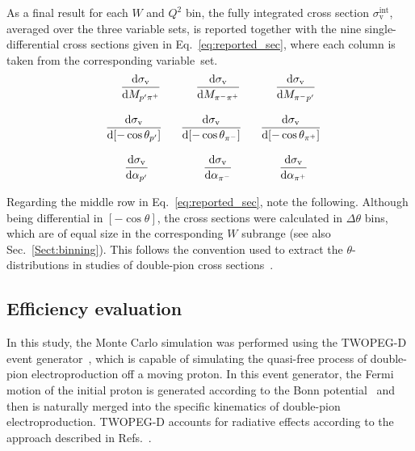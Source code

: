 \documentclass[prc,twocolumn,superscriptaddress,showpacs,amssymb,amsmath,amsfonts,aps,nofootinbib]{revtex4-1}
\begin{document}
As a final result for each $W$ and $Q^{2}$ bin, the fully integrated cross section $\sigma_{\text{v}}^{\text{int}}$, averaged over the three variable sets, is reported together with the nine single-differential cross sections given in Eq.\!~\eqref{eq:reported_sec}, where each column is taken from the corresponding variable~set.
\begin{equation}
\begin{aligned}
&~~~~~~\frac{\textrm{\textrm{d}}\sigma_{\text{v}}}{\textrm{d}M_{p'\pi^{+}}}&&~~~~~~\frac{\textrm{d}\sigma_{\text{v}}}{\textrm{d}M_{\pi^{-}\pi^{+}}}&&~~~~~~\frac{\textrm{d}\sigma_{\text{v}}}{\textrm{d}M_{\pi^{-}p'}}\\[8pt] 
&~~\frac{\textrm{d}\sigma_{\text{v}}}{\textrm{d}[-\cos\theta_{p'}]}&&~~\frac{\textrm{d}\sigma_{\text{v}}}{\textrm{d}[-\cos\theta_{\pi^{-}}]}&&~~\frac{\textrm{d}\sigma_{\text{v}}}{\textrm{d}[-\cos\theta_{\pi^{+}}]}\\[8pt] 
&~~~~~~~\frac{\textrm{d}\sigma_{\text{v}}}{\textrm{d}\alpha_{p'}}&&~~~~~~~~\frac{\textrm{d}\sigma_{\text{v}}}{\textrm{d}\alpha_{\pi^{-}}}&&~~~~~~~\frac{\textrm{d}\sigma_{\text{v}}}{\textrm{d}\alpha_{\pi^{+}}}
\end{aligned}
\label{eq:reported_sec}
\end{equation}


Regarding the middle row in Eq.\!~\eqref{eq:reported_sec}, note the following. Although being differential in $[-\cos\theta]$, the cross sections were calculated in $\Delta \theta$ bins, which are of equal size in the corresponding $W$ subrange (see also Sec.\!~\ref{Sect:binning}). This follows the convention used to extract the $\theta$-distributions in studies of double-pion cross sections~\cite{Rip_an_note:2002,Ripani:2002ss,Fed_an_note:2007,Fedotov:2008aa,Isupov:2017lnd,Arjun,Fed_an_note:2017,Fed_paper_2018}.

\subsection{Efficiency evaluation}
\label{Sect:eff_eval}

In this study, the Monte Carlo simulation was performed using the TWOPEG-D event generator~\cite{twopeg-d}, which is capable of simulating the quasi-free process of double-pion electroproduction off a moving proton. In this event generator, the Fermi motion of the initial proton is generated according to the Bonn potential~\cite{Machleidt:1987hj} and then is naturally merged into the specific kinematics of double-pion electroproduction. TWOPEG-D accounts for radiative effects according to the approach described in Refs.\!~\cite{Mo:1968cg,twopeg}.
\end{document}
